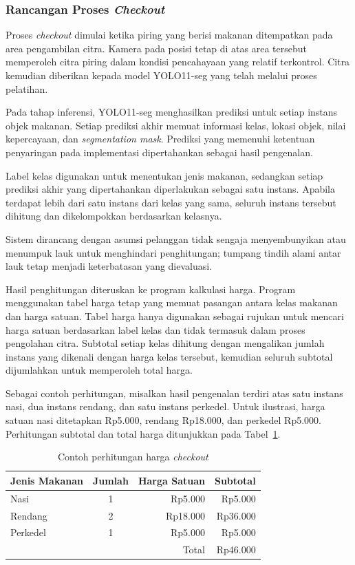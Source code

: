 \subsubsection{Rancangan Proses \textit{Checkout}}

Proses \textit{checkout} dimulai ketika piring yang berisi makanan ditempatkan pada area pengambilan citra. Kamera pada posisi tetap di atas area tersebut memperoleh citra piring dalam kondisi pencahayaan yang relatif terkontrol. Citra kemudian diberikan kepada model YOLO11-seg yang telah melalui proses pelatihan.

Pada tahap inferensi, YOLO11-seg menghasilkan prediksi untuk setiap instans objek makanan. Setiap prediksi akhir memuat informasi kelas, lokasi objek, nilai kepercayaan, dan \textit{segmentation mask}. Prediksi yang memenuhi ketentuan penyaringan pada implementasi dipertahankan sebagai hasil pengenalan.

Label kelas digunakan untuk menentukan jenis makanan, sedangkan setiap prediksi akhir yang dipertahankan diperlakukan sebagai satu instans. Apabila terdapat lebih dari satu instans dari kelas yang sama, seluruh instans tersebut dihitung dan dikelompokkan berdasarkan kelasnya.

Sistem dirancang dengan asumsi pelanggan tidak sengaja menyembunyikan atau menumpuk lauk untuk menghindari penghitungan; tumpang tindih alami antar lauk tetap menjadi keterbatasan yang dievaluasi.

Hasil penghitungan diteruskan ke program kalkulasi harga. Program menggunakan tabel harga tetap yang memuat pasangan antara kelas makanan dan harga satuan. Tabel harga hanya digunakan sebagai rujukan untuk mencari harga satuan berdasarkan label kelas dan tidak termasuk dalam proses pengolahan citra. Subtotal setiap kelas dihitung dengan mengalikan jumlah instans yang dikenali dengan harga kelas tersebut, kemudian seluruh subtotal dijumlahkan untuk memperoleh total harga.

Sebagai contoh perhitungan, misalkan hasil pengenalan terdiri atas satu instans nasi, dua instans rendang, dan satu instans perkedel. Untuk ilustrasi, harga satuan nasi ditetapkan Rp5.000, rendang Rp18.000, dan perkedel Rp5.000. Perhitungan subtotal dan total harga ditunjukkan pada Tabel~\ref{tab:contoh-harga}.

\begin{table}[H]
    \centering
    \caption{Contoh perhitungan harga \textit{checkout}}
    \label{tab:contoh-harga}
    \begin{tabular}{lcrr}
        \hline
        Jenis Makanan & Jumlah & Harga Satuan & Subtotal \\
        \hline
        Nasi & 1 & Rp5.000 & Rp5.000 \\
        Rendang & 2 & Rp18.000 & Rp36.000 \\
        Perkedel & 1 & Rp5.000 & Rp5.000 \\
        \hline
        & & Total & Rp46.000 \\
        \hline
    \end{tabular}
\end{table}


